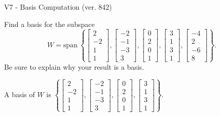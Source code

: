 \begin{exercise}
  \begin{exerciseTitle}V7 - Basis Computation (ver. 842)\end{exerciseTitle}
  \begin{exerciseStatement}
    Find a basis for the subspace 
\[W=\mathrm{span}\ \left\{\left[\begin{array}{r}
2 \\
-2 \\
1 \\
1
\end{array}\right] , \left[\begin{array}{r}
-2 \\
-1 \\
-3 \\
3
\end{array}\right] , \left[\begin{array}{r}
0 \\
2 \\
0 \\
1
\end{array}\right] , \left[\begin{array}{r}
3 \\
1 \\
3 \\
1
\end{array}\right] , \left[\begin{array}{r}
-4 \\
2 \\
-6 \\
8
\end{array}\right]\right\}.\]
 Be sure to explain why your result is a basis.


  \end{exerciseStatement}
  \begin{exerciseAnswer}
   A basis of \(W\) is  \(\left\{\left[\begin{array}{r}
2 \\
-2 \\
1 \\
1
\end{array}\right] , \left[\begin{array}{r}
-2 \\
-1 \\
-3 \\
3
\end{array}\right] , \left[\begin{array}{r}
0 \\
2 \\
0 \\
1
\end{array}\right] , \left[\begin{array}{r}
3 \\
1 \\
3 \\
1
\end{array}\right]\right\}\).
  


  \end{exerciseAnswer}
\end{exercise}